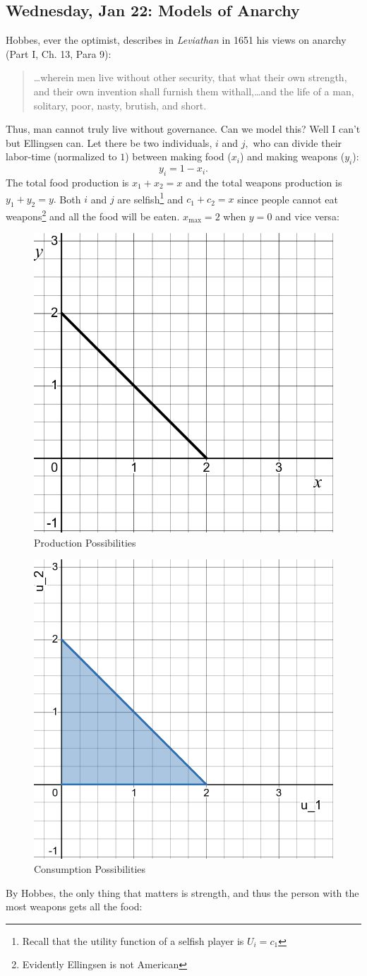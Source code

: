\documentclass[10pt, oneside]{article}
\theoremstyle{definition}
\begin{document}
\subsection{Wednesday, Jan 22: Models of Anarchy}
Hobbes, ever the optimist, describes in \textit{Leviathan} in 1651 his views on anarchy (Part I, Ch. 13, Para 9):
\begin{quote}
    \dots wherein men live without other security, that what their own strength, and their own invention shall furnish them withall,\dots and the life of a man, solitary, poor, nasty, brutish, and short.
\end{quote}
Thus, man cannot truly live without governance. Can we model this? Well I can't but Ellingsen can. Let there be two individuals, $i$ and $j,$ who can divide their labor-time (normalized to $1$) between making food ($x_i$) and making weapons ($y_i$):
\[y_i = 1- x_i.\] The total food production is $x_1 + x_2 = x$ and the total weapons production is $y_1 + y_2 = y.$ Both $i$ and $j$ are selfish\footnote{Recall that the utility function of a selfish player is $U_i = c_1$} and $c_1 + c_2 = x$ since people cannot eat weapons\footnote{Evidently Ellingsen is not American} and all the food will be eaten. $x_{\max} = 2$ when $y = 0$ and vice versa:
\begin{figure}[H]
    \centering
    \includegraphics[width=0.25\linewidth]{Images/Production_Possibilities.png}
    \caption{Production Possibilities}
\end{figure}
\begin{figure}[H]
    \centering
    \includegraphics[width=0.25\linewidth]{Images/Consumption_Possibilities.png}
    \caption{Consumption Possibilities}
\end{figure}
By Hobbes, the only thing that matters is strength, and thus the person with the most weapons gets all the food:
\end{document}
